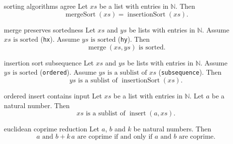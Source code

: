 \begin{cleanresult}{sorting algorithms agree}
Let $\mathit{xs}$ be a list with entries in $\mathbb{N}$.
Then \[\operatorname{mergeSort}(\mathit{xs})=\operatorname{insertionSort}(\mathit{xs}).\]
\end{cleanresult}

\begin{cleanresult}{merge preserves sortedness}
Let $\mathit{xs}$ and $\mathit{ys}$ be lists with entries in $\mathbb{N}$.
Assume $\mathit{xs}\text{ is sorted}$ (\texttt{hx}).
Assume $\mathit{ys}\text{ is sorted}$ (\texttt{hy}).
Then \[\operatorname{merge}(\mathit{xs},\mathit{ys})\text{ is sorted}.\]
\end{cleanresult}

\begin{cleanresult}{insertion sort subsequence}
Let $\mathit{xs}$ and $\mathit{ys}$ be lists with entries in $\mathbb{N}$.
Assume $\mathit{ys}\text{ is sorted}$ (\texttt{ordered}).
Assume $\mathit{ys}\text{ is a sublist of }\mathit{xs}$ (\texttt{subsequence}).
Then \[\mathit{ys}\text{ is a sublist of }\operatorname{insertionSort}(\mathit{xs}).\]
\end{cleanresult}

\begin{cleanresult}{ordered insert contains input}
Let $\mathit{xs}$ be a list with entries in $\mathbb{N}$.
Let $a$ be a natural number.
Then \[\mathit{xs}\text{ is a sublist of }\operatorname{insert}(a,\mathit{xs}).\]
\end{cleanresult}

\begin{cleanresult}{euclidean coprime reduction}
Let $a$, $b$ and $k$ be natural numbers.
Then \[a\text{ and }b+k\,a\text{ are coprime}\text{ if and only if }a\text{ and }b\text{ are coprime}.\]
\end{cleanresult}

